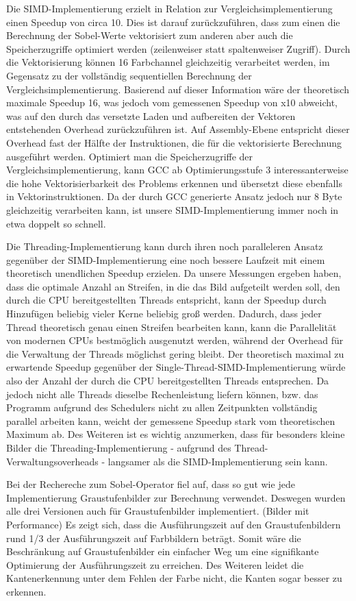 \documentclass[course=erap]{aspdoc}
\begin{document}
Die SIMD-Implementierung erzielt in Relation zur Vergleichsimplementierung einen Speedup von circa 10.
Dies ist darauf zurückzuführen, dass zum einen die Berechnung der Sobel-Werte vektorisiert zum anderen aber auch die Speicherzugriffe optimiert werden (zeilenweiser statt spaltenweiser Zugriff).
Durch die Vektorisierung können 16 Farbchannel gleichzeitig verarbeitet werden, im Gegensatz zu der vollständig sequentiellen Berechnung der Vergleichsimplementierung.
Basierend auf dieser Information wäre der theoretisch maximale Speedup 16, was jedoch vom gemessenen Speedup von x10 abweicht, was auf den durch das versetzte Laden und aufbereiten der Vektoren entstehenden Overhead zurückzuführen ist.
Auf Assembly-Ebene entspricht dieser Overhead fast der Hälfte der Instruktionen, die für die vektorisierte Berechnung ausgeführt werden.
Optimiert man die Speicherzugriffe der Vergleichsimplementierung, kann GCC ab Optimierungsstufe 3 interessanterweise die hohe Vektorisierbarkeit des Problems erkennen und übersetzt diese ebenfalls in Vektorinstruktionen.
Da der durch GCC generierte Ansatz jedoch nur 8 Byte gleichzeitig verarbeiten kann, ist unsere SIMD-Implementierung immer noch in etwa doppelt so schnell.

Die Threading-Implementierung kann durch ihren noch paralleleren Ansatz gegenüber der SIMD-Implementierung eine noch bessere Laufzeit mit einem theoretisch unendlichen Speedup erzielen.
Da unsere Messungen ergeben haben, dass die optimale Anzahl an Streifen, in die das Bild aufgeteilt werden soll, den durch die CPU bereitgestellten Threads entspricht, kann der Speedup durch Hinzufügen beliebig vieler Kerne beliebig groß werden.
Dadurch, dass jeder Thread theoretisch genau einen Streifen bearbeiten kann, kann die Parallelität von modernen CPUs bestmöglich ausgenutzt werden, während der Overhead für die Verwaltung der Threads möglichst gering bleibt.
Der theoretisch maximal zu erwartende Speedup gegenüber der Single-Thread-SIMD-Implementierung würde also der Anzahl der durch die CPU bereitgestellten Threads entsprechen.
Da jedoch nicht alle Threads dieselbe Rechenleistung liefern können, bzw. das Programm aufgrund des Schedulers nicht zu allen Zeitpunkten vollständig parallel arbeiten kann, weicht der gemessene Speedup stark vom theoretischen Maximum ab.
Des Weiteren ist es wichtig anzumerken, dass für besonders kleine Bilder die Threading-Implementierung - aufgrund des Thread-Verwaltungsoverheads - langsamer als die SIMD-Implementierung sein kann.

Bei der Rechereche zum Sobel-Operator fiel auf, dass so gut wie jede Implementierung Graustufenbilder zur Berechnung verwendet.
Deswegen wurden alle drei Versionen auch für Graustufenbilder implementiert.
(Bilder mit Performance)
Es zeigt sich, dass die Ausführungszeit auf den Graustufenbildern rund 1/3 der Ausführungszeit auf Farbbildern beträgt.
Somit wäre die Beschränkung auf Graustufenbilder ein einfacher Weg um eine signifikante Optimierung der Ausführungszeit zu erreichen.
Des Weiteren leidet die Kantenerkennung unter dem Fehlen der Farbe nicht, die Kanten sogar besser zu erkennen.
\end{document}
